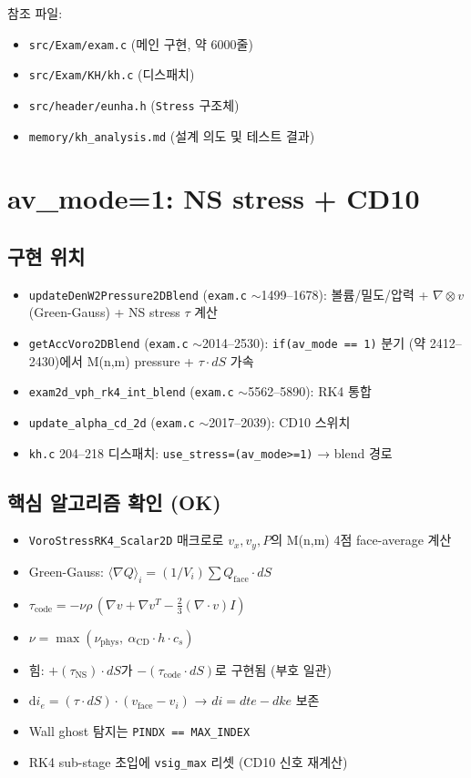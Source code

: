 \documentclass[11pt]{article}
\begin{document}
참조 파일:
\begin{itemize}
  \item \texttt{src/Exam/exam.c} (메인 구현, 약 6000줄)
  \item \texttt{src/Exam/KH/kh.c} (디스패치)
  \item \texttt{src/header/eunha.h} (\texttt{Stress} 구조체)
  \item \texttt{memory/kh\_analysis.md} (설계 의도 및 테스트 결과)
\end{itemize}

\section{av\_mode=1: NS stress + CD10}

\subsection{구현 위치}
\begin{itemize}
  \item \texttt{updateDenW2Pressure2DBlend} (\texttt{exam.c} $\sim$1499--1678):
    볼륨/밀도/압력 + $\nabla\otimes v$ (Green-Gauss) + NS stress $\tau$ 계산
  \item \texttt{getAccVoro2DBlend} (\texttt{exam.c} $\sim$2014--2530):
    \texttt{if(av\_mode == 1)} 분기 (약 2412--2430)에서 M(n,m) pressure + $\tau\cdot dS$ 가속
  \item \texttt{exam2d\_vph\_rk4\_int\_blend} (\texttt{exam.c} $\sim$5562--5890): RK4 통합
  \item \texttt{update\_alpha\_cd\_2d} (\texttt{exam.c} $\sim$2017--2039): CD10 스위치
  \item \texttt{kh.c} 204--218 디스패치: \texttt{use\_stress=(av\_mode>=1)} → blend 경로
\end{itemize}

\subsection{핵심 알고리즘 확인 (OK)}
\begin{itemize}
  \item \texttt{VoroStressRK4\_Scalar2D} 매크로로 $v_x, v_y, P$의 M(n,m) 4점 face-average 계산
  \item Green-Gauss: $\langle\nabla Q\rangle_i = (1/V_i)\sum Q_\mathrm{face}\cdot dS$
  \item $\tau_\mathrm{code} = -\nu\rho\,(\nabla v + \nabla v^T - \tfrac{2}{3}(\nabla\cdot v)I)$
  \item $\nu = \max(\nu_\mathrm{phys},\ \alpha_\mathrm{CD}\cdot h\cdot c_s)$
  \item 힘: $+(\tau_\mathrm{NS})\cdot dS$가 $-(\tau_\mathrm{code}\cdot dS)$로 구현됨 (부호 일관)
  \item $\mathrm{d}i_e = (\tau\cdot dS)\cdot(v_\mathrm{face} - v_i)$ → $di = dte - dke$ 보존
  \item Wall ghost 탐지는 \texttt{PINDX == MAX\_INDEX}
  \item RK4 sub-stage 초입에 \texttt{vsig\_max} 리셋 (CD10 신호 재계산)
\end{itemize}
\end{document}

